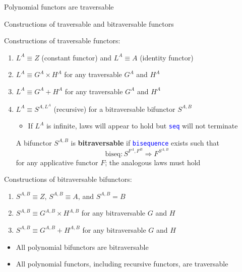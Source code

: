 \documentclass[english]{beamer}
\begin{document}
\begin{frame}{Polynomial functors are traversable}
\begin{itemize}
\begin{itemize}
{\begin{frame}{Constructions of traversable and bitraversable functors}

Constructions of traversable functors:
\begin{enumerate}
\item $L^{A}\equiv Z$ (constant functor) and $L^{A}\equiv A$ (identity
functor)
\item $L^{A}\equiv G^{A}\times H^{A}$ for any traversable $G^{A}$ and
$H^{A}$
\item $L^{A}\equiv G^{A}+H^{A}$ for any traversable $G^{A}$ and $H^{A}$
\item $L^{A}\equiv S^{A,L^{A}}$ (recursive) for a bitraversable bifunctor
$S^{A,B}$ 
\begin{itemize}
\item If $L^{A}$ is infinite, laws will appear to hold but \texttt{\textcolor{blue}{\footnotesize{}seq}}
will not terminate
\end{itemize}
A bifunctor $S^{A,B}$ is \textbf{bitraversable} if \texttt{\textcolor{blue}{\footnotesize{}bisequence}}
exists such that
\[
\text{biseq}:S^{F^{A},F^{B}}\Rightarrow F^{S^{A,B}}
\]
 for any applicative functor $F$; the analogous laws must hold
\end{enumerate}
Constructions of bitraversable bifunctors:
\begin{enumerate}
\item $S^{A,B}\equiv Z$, $S^{A,B}\equiv A$, and $S^{A,B}=B$
\item $S^{A,B}\equiv G^{A,B}\times H^{A,B}$ for any bitraversable $G$
and $H$
\item $S^{A,B}\equiv G^{A,B}+H^{A,B}$ for any bitraversable $G$ and $H$
\end{enumerate}
\begin{itemize}
\item All polynomial bifunctors are bitraversable
\item All polynomial functors, including recursive functors, are traversable
\end{itemize}
\end{frame}

}
\end{itemize}
\end{itemize}
\end{frame}
\end{document}
